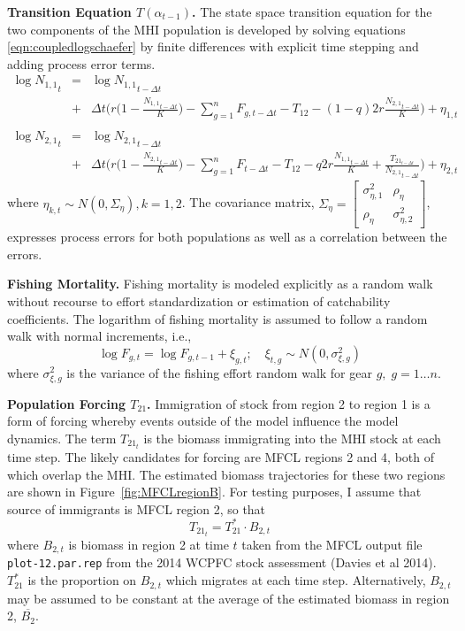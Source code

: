\documentclass[12pt,letterpaper]{article}
\newcommand\widebar[1]{\overline{#1}}
\newcommand\None{{N_{1,1}}}
\newcommand\Ntwo{{N_{2,1}}}
\begin{document}
{\bf Transition Equation $T(\alpha_{t-1})$.}
The state space transition equation for the two components of the MHI
population is developed by solving
equations \ref{eqn:coupledlogschaefer} by finite differences
with explicit time stepping and adding process error
terms.
\begin{eqnarray}
\log \None_t &=& \log \None_{t-\Delta t}\nonumber\\ 
             &+&\Delta t\bigg(r\Big(1-\frac{\None_{t-\Delta t}}{K}\Big)
-\sum_{g=1}^n F_{g,t-\Delta t} - T_{12} - (1-q)2r\frac{\Ntwo_{t-\Delta
t}}{K}\bigg)+\eta_{1,t}\nonumber\\
\\ \log \Ntwo_t &=& \log \Ntwo_{t-\Delta t}\nonumber\\
             &+&\Delta t\bigg(r\Big(1-\frac{\Ntwo_{t-\Delta t}}{K}\Big)
-\sum_{g=1}^n F_{t-\Delta t} - T_{12} - q2r\frac{\None_{t-\Delta t}}{K}
     +\frac{T_{{21}_{t-\Delta t}}}{\Ntwo_{t-\Delta t}}\bigg)+\eta_{2,t}\nonumber
\label{eqn:finitecoupledlogschaefer}
\end{eqnarray}
where $\eta_{k,t} \sim N(0,\Sigma_\eta),k=1,2$. The covariance matrix,
$\Sigma_\eta = \left[\begin{array}{cc}\sigma^2_{\eta,1}&\rho_\eta\\
                                     \rho_\eta&\sigma^2_{\eta,2}
\end{array}\right]$,
expresses process errors for both populations as well as a
correlation between the errors.

{\bf Fishing Mortality.}
Fishing mortality is
modeled explicitly as a random walk
without recourse to effort standardization or
estimation of catchability coefficients. The logarithm of fishing
mortality is assumed to
follow a random walk with normal increments, i.e.,
\begin{equation}
\log F_{g,t} = \log F_{g,t-1} + \xi_{g,t};\quad \xi_{t,g}\sim
N(0,\sigma^2_{\xi,g}) \label{eqn:Fwalk}
\end{equation}
where  $\sigma^2_{\xi,g}$ is the variance of the fishing
effort random walk for gear $g,\; g=1\ldots n$.

{\bf Population Forcing $T_{21}$.}
Immigration of stock from region 2 to region 1 is a
form of forcing whereby events outside of the model influence the
model dynamics. The term $T_{{21}_t}$ is the biomass immigrating
into the MHI stock at each time step. 
The likely candidates for forcing are MFCL regions 2 and 4, both of
which overlap the MHI. The estimated biomass trajectories for these
two regions are shown in Figure~\ref{fig:MFCLregionB}.
For testing purposes,
I assume that source of immigrants is MFCL region 2, so that
\begin{equation}
T_{{21}_t} = T^*_{21}\cdot B_{2,t}
\end{equation}
where $B_{2,t}$ is biomass in region 2 at time $t$ taken from the MFCL output file
{\tt plot-12.par.rep} from the 2014 WCPFC stock assessment
(Davies et al 2014). $T^*_{21}$ is the proportion on
$B_{2,t}$ which migrates at each time step.
Alternatively, $B_{2,t}$ may be assumed to be constant at the average
of the estimated biomass in region 2, $\widebar{B_{2}}$.
\end{document}
